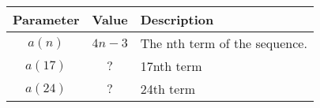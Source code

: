 
    \begin{tabular}{|c|c|p{6cm}|}
        \hline
        \textbf{Parameter} & \textbf{Value} & \textbf{Description} \\
        \hline
        \rule{0pt}{2.5ex} %
        $a(n)$ & \(4n-3\) & The nth term of the sequence. \\
        \hline
        \rule{0pt}{2.5ex} %
        $a(17)$ & $?$ & 17nth term \\
        \hline
        \rule{0pt}{2.5ex} %
        $a(24)$ & $?$ & 24th term \\
        \hline
    \end{tabular}
  
